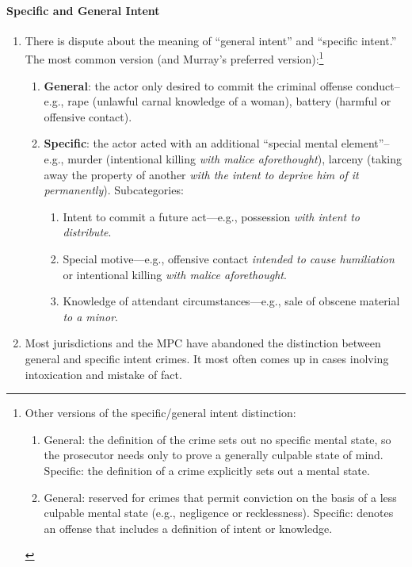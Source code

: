 \paragraph{Specific and General Intent}

\begin{enumerate}
    \item There is dispute about the meaning of ``general intent'' and 
    ``specific intent.'' The most common version (and Murray's preferred 
    version):\footnote{Other versions of the specific/general intent 
    distinction:
    \begin{enumerate}
        \item General: the definition of the crime sets out no specific mental 
        state, so the prosecutor needs only to prove a generally culpable 
        state of mind. Specific: the definition of a crime explicitly sets out 
        a mental state.
        \item General: reserved for crimes that permit conviction on the basis 
        of a less culpable mental state (e.g., negligence or recklessness).  
        Specific: denotes an offense that includes a definition of intent or 
        knowledge.
    \end{enumerate}}
    \begin{enumerate}
        \item \textbf{General}: the actor only desired to commit the criminal 
        offense conduct--e.g., rape (unlawful carnal knowledge of a woman), 
        battery (harmful or offensive contact).
        \item \textbf{Specific}: the actor acted with an additional ``special 
        mental element''--e.g., murder (intentional killing \emph{with malice 
        aforethought}), larceny (taking away the property of another 
        \emph{with the intent to deprive him of it permanently}). 
        Subcategories:
        \begin{enumerate}
            \item Intent to commit a future act---e.g., possession \emph{with 
            intent to distribute}.
            \item Special motive---e.g., offensive contact \emph{intended to 
            cause humiliation} or intentional killing \emph{with malice 
            aforethought}.
            \item Knowledge of attendant circumstances---e.g., sale of obscene 
            material \emph{to a minor}.
        \end{enumerate}
    \end{enumerate}
    \item Most jurisdictions and the MPC have abandoned the distinction 
    between general and specific intent crimes. It most often comes up in 
    cases inolving intoxication and mistake of fact.
\end{enumerate}

